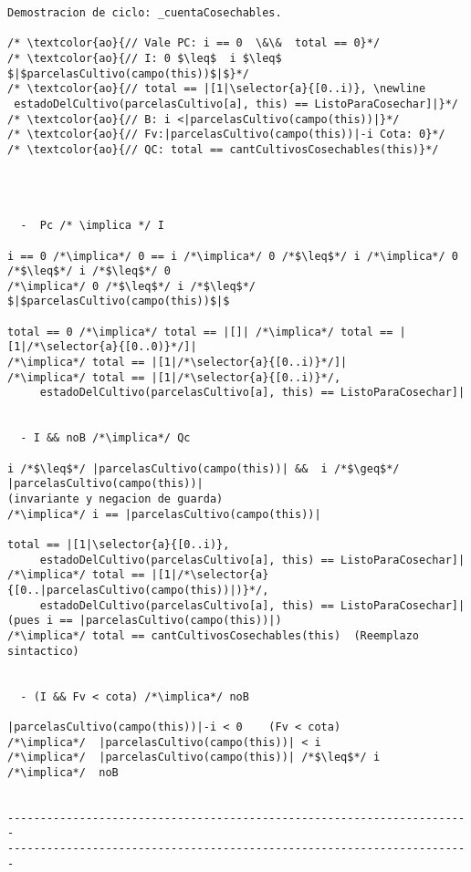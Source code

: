 \begin{lstlisting}
Demostracion de ciclo: _cuentaCosechables.

/* \textcolor{ao}{// Vale PC: i == 0  \&\&  total == 0}*/
/* \textcolor{ao}{// I: 0 $\leq$  i $\leq$ $|$parcelasCultivo(campo(this))$|$}*/
/* \textcolor{ao}{// total == |[1|\selector{a}{[0..i)}, \newline
 estadoDelCultivo(parcelasCultivo[a], this) == ListoParaCosechar]|}*/
/* \textcolor{ao}{// B: i <|parcelasCultivo(campo(this))|}*/
/* \textcolor{ao}{// Fv:|parcelasCultivo(campo(this))|-i Cota: 0}*/
/* \textcolor{ao}{// QC: total == cantCultivosCosechables(this)}*/    




  -  Pc /* \implica */ I
  
i == 0 /*\implica*/ 0 == i /*\implica*/ 0 /*$\leq$*/ i /*\implica*/ 0 /*$\leq$*/ i /*$\leq$*/ 0 
/*\implica*/ 0 /*$\leq$*/ i /*$\leq$*/ $|$parcelasCultivo(campo(this))$|$

total == 0 /*\implica*/ total == |[]| /*\implica*/ total == |[1|/*\selector{a}{[0..0)}*/]|
/*\implica*/ total == |[1|/*\selector{a}{[0..i)}*/]| 
/*\implica*/ total == |[1|/*\selector{a}{[0..i)}*/, 
     estadoDelCultivo(parcelasCultivo[a], this) == ListoParaCosechar]|


  - I && noB /*\implica*/ Qc
  
i /*$\leq$*/ |parcelasCultivo(campo(this))| &&  i /*$\geq$*/ |parcelasCultivo(campo(this))| 
(invariante y negacion de guarda)
/*\implica*/ i == |parcelasCultivo(campo(this))|

total == |[1|\selector{a}{[0..i)}, 
     estadoDelCultivo(parcelasCultivo[a], this) == ListoParaCosechar]|
/*\implica*/ total == |[1|/*\selector{a}{[0..|parcelasCultivo(campo(this))|)}*/,
     estadoDelCultivo(parcelasCultivo[a], this) == ListoParaCosechar]|
(pues i == |parcelasCultivo(campo(this))|)
/*\implica*/ total == cantCultivosCosechables(this)  (Reemplazo sintactico)


  - (I && Fv < cota) /*\implica*/ noB

|parcelasCultivo(campo(this))|-i < 0    (Fv < cota)
/*\implica*/  |parcelasCultivo(campo(this))| < i    
/*\implica*/  |parcelasCultivo(campo(this))| /*$\leq$*/ i
/*\implica*/  noB


-----------------------------------------------------------------------
-----------------------------------------------------------------------

\end{lstlisting}


